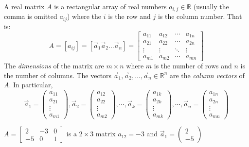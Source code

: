 \begin{definition}
A real matrix $A$ is a rectangular array of real numbers $a_{i,j} \in \mathbb{R}$ (usually the comma is omitted $a_{ij}$)  where the $i$ is the row and $j$ is the column number. That is:
\[
A=[a_{ij}]=[\vec{a}_1 \vec{a}_2 \ldots \vec{a}_n]=
\begin{bmatrix}
a_{11} & a_{12} & \cdots & a_{1n} \\
a_{21} & a_{22} & \cdots & a_{2n} \\
\vdots & \vdots & \ddots & \vdots \\
a_{m1} & a_{m2} & \cdots & a_{mn} 
\end{bmatrix}
\]
The \emph{dimensions} of the matrix are $m\times n$ where $m$ is the number of rows and $n$ is the number of columns. The vectors $\vec{a}_1, \vec{a}_2, \ldots, \vec{a}_n \in \mathbb{R}^n$ are the \emph{column vectors} of $A$. In particular, 
\[
\vec{a}_1=\begin{pmatrix}a_{11}\\a_{21}\\ \vdots \\ a_{m1}\end{pmatrix},
\vec{a}_2=\begin{pmatrix}a_{12}\\a_{22}\\ \vdots \\ a_{m2}\end{pmatrix}, \cdots,
\vec{a}_k=\begin{pmatrix}a_{1k}\\a_{2k}\\ \vdots \\ a_{mk}\end{pmatrix}, \cdots,
\vec{a}_n=\begin{pmatrix}a_{1n}\\a_{2n}\\ \vdots \\ a_{mn}\end{pmatrix}
\]
\end{definition}
\begin{example}
$A=\left[ \begin{array}{rrr}
2 & -3 & 0 \\
-5 & 0 & 1 \end{array}\right]$
is a $2 \times 3$ matrix $a_{12}=-3$ and  $\vec{a}_1=\left(\begin{array}{r} 2 \\ -5 \end{array}\right)$
\end{example}

